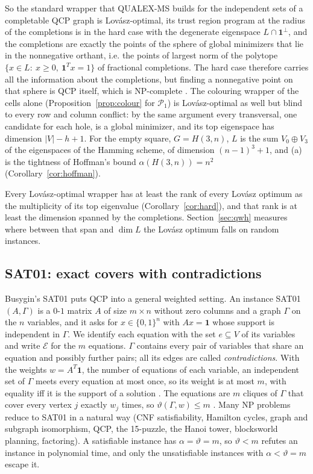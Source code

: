 \documentclass[11pt]{article}
\theoremstyle{definition}
\theoremstyle{remark}
\newcommand{\one}{\mathbf{1}}
\begin{document}
So the standard wrapper that QUALEX-MS builds for the independent sets of a
completable QCP graph is Lov\'asz-optimal, its trust region program at the
radius of the completions is in the hard case with the degenerate
eigenspace $L\cap\one^\perp$, and the completions are exactly the points of
the sphere of global minimizers that lie in the nonnegative orthant, i.e.
the points of largest norm of the polytope $\{x\in L:\ x\geq0,\ \one^Tx=1\}$
of fractional completions. The hard case therefore carries all the
information about the completions, but finding a nonnegative point on that
sphere is QCP itself, which is NP-complete \cite{Co84}. The colouring wrapper
of the cells alone (Proposition~\ref{prop:colour} for $\mathcal{P}_1$) is
Lov\'asz-optimal as well but blind to every row and column conflict: by the
same argument every transversal, one candidate for each hole, is a global
minimizer, and its top eigenspace has dimension $|V|-h+1$. For the empty
square, $G=H(3,n)$, $L$ is the sum $V_0\oplus V_3$ of the eigenspaces of the
Hamming scheme, of dimension $(n-1)^3+1$, and (a) is the tightness of
Hoffman's bound $\alpha(H(3,n))=n^2$ (Corollary~\ref{cor:hoffman}).

Every Lov\'asz-optimal wrapper has at least the rank of every Lov\'asz
optimum as the multiplicity of its top eigenvalue (Corollary~\ref{cor:hard}),
and that rank is at least the dimension spanned by the completions.
Section~\ref{sec:qwh} measures where between that span and $\dim L$ the
Lov\'asz optimum falls on random instances.

\subsection{SAT01: exact covers with contradictions}
\label{sec:sat01}

Busygin's SAT01 \cite{Bu07} puts QCP into a general weighted setting. An
instance SAT01$(A,\Gamma)$ is a $0$-$1$ matrix $A$ of size $m\times n$
without zero columns and a graph $\Gamma$ on the $n$ variables, and it asks
for $x\in\{0,1\}^n$ with $Ax=\one$ whose support is independent in $\Gamma$.
We identify each equation with the set $e\subseteq V$ of its variables and
write $\mathcal E$ for the $m$ equations. $\Gamma$ contains every pair of
variables that share an equation and possibly further pairs; all its edges
are called {\em contradictions}. With the weights $w=A^T\one$, the number of
equations of each variable, an independent set of $\Gamma$ meets every
equation at most once, so its weight is at most $m$, with equality iff it is
the support of a solution \cite[Lemma~1]{Bu07}. The equations are $m$
cliques of $\Gamma$ that cover every vertex $j$ exactly $w_j$ times, so
$\vartheta(\Gamma,w)\leq m$ \cite[Theorem~1]{Bu07}. Many NP problems reduce to
SAT01 in a natural way (CNF satisfiability, Hamilton cycles, graph and
subgraph isomorphism, QCP, the 15-puzzle, the Hanoi tower, blocksworld
planning, factoring). A satisfiable instance
has $\alpha=\vartheta=m$, so $\vartheta<m$ refutes an instance in polynomial
time, and only the unsatisfiable instances with $\alpha<\vartheta=m$ escape
it.
\end{document}
